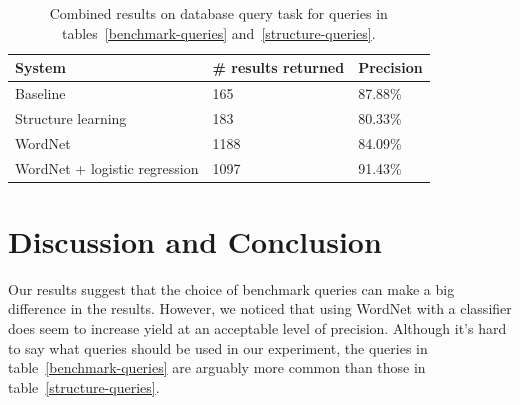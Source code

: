 \documentclass{article}
\begin{document}
\begin{table}[h]
  \caption{Combined results on database query task for queries in tables~\ref{benchmark-queries} and~\ref{structure-queries}.}\label{structure-results}
  \begin{center}
    \begin{tabular}{l l l}
      \toprule
      System & \# results returned & Precision\\
      \midrule
      Baseline & 165 & 87.88\%\\
      Structure learning & 183 & 80.33\%\\
      WordNet & 1188 & 84.09\% \\
      WordNet + logistic regression & 1097 & 91.43\%\\
      \bottomrule
    \end{tabular}
  \end{center}
\end{table}

\section{Discussion and Conclusion}
Our results suggest that the choice of benchmark queries can make a big difference in the results. However, we noticed that using WordNet with a classifier does seem to increase yield at an acceptable level of precision. Although it's hard to say what queries should be used in our experiment, the queries in table~\ref{benchmark-queries} are arguably more common than those in table~\ref{structure-queries}.




\end{document}
